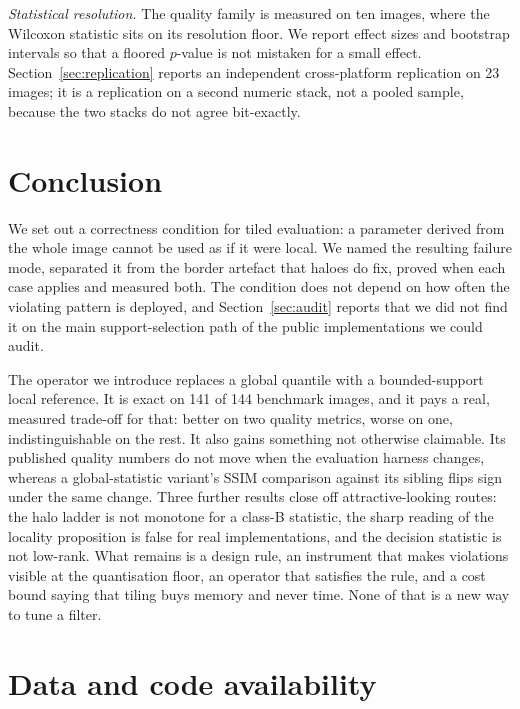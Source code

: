 \documentclass[journal]{IEEEtran}
\begin{document}
\emph{Statistical resolution.} The quality family is measured on ten images, where the Wilcoxon statistic sits on its resolution floor. We report effect sizes and bootstrap intervals so that a floored \(p\)-value is not mistaken for a small effect. Section~\ref{sec:replication} reports an independent cross-platform replication on 23 images; it is a replication on a second numeric stack, not a pooled sample, because the two stacks do not agree bit-exactly.

\section{Conclusion}\label{sec:conclusion}

We set out a correctness condition for tiled evaluation: a parameter derived from the whole image cannot be used as if it were local. We named the resulting failure mode, separated it from the border artefact that haloes do fix, proved when each case applies and measured both. The condition does not depend on how often the violating pattern is deployed, and Section~\ref{sec:audit} reports that we did not find it on the main support-selection path of the public implementations we could audit.

The operator we introduce replaces a global quantile with a bounded-support local reference. It is exact on 141 of 144 benchmark images, and it pays a real, measured trade-off for that: better on two quality metrics, worse on one, indistinguishable on the rest. It also gains something not otherwise claimable. Its published quality numbers do not move when the evaluation harness changes, whereas a global-statistic variant's SSIM comparison against its sibling flips sign under the same change. Three further results close off attractive-looking routes: the halo ladder is not monotone for a class-B statistic, the sharp reading of the locality proposition is false for real implementations, and the decision statistic is not low-rank. What remains is a design rule, an instrument that makes violations visible at the quantisation floor, an operator that satisfies the rule, and a cost bound saying that tiling buys memory and never time. None of that is a new way to tune a filter.

\section{Data and code availability}\label{data-and-code-availability}
\end{document}
